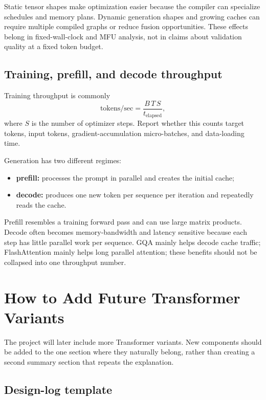 \documentclass[11pt,a4paper]{article}
\theoremstyle{definition}
\theoremstyle{plain}
\begin{document}
Static tensor shapes make optimization easier because the compiler can specialize schedules and memory plans. Dynamic generation shapes and growing caches can require multiple compiled graphs or reduce fusion opportunities. These effects belong in fixed-wall-clock and MFU analysis, not in claims about validation quality at a fixed token budget.

\subsection{Training, prefill, and decode throughput}

Training throughput is commonly
\begin{equation}
    \mathrm{tokens/sec}
    =\frac{B\,T\,S}{t_{\mathrm{elapsed}}},
\end{equation}
where $S$ is the number of optimizer steps. Report whether this counts target tokens, input tokens, gradient-accumulation micro-batches, and data-loading time.

Generation has two different regimes:
\begin{itemize}[nosep]
    \item \textbf{prefill:} processes the prompt in parallel and creates the initial cache;
    \item \textbf{decode:} produces one new token per sequence per iteration and repeatedly reads the cache.
\end{itemize}
Prefill resembles a training forward pass and can use large matrix products. Decode often becomes memory-bandwidth and latency sensitive because each step has little parallel work per sequence. GQA mainly helps decode cache traffic; FlashAttention mainly helps long parallel attention; these benefits should not be collapsed into one throughput number.

\section{How to Add Future Transformer Variants}
\label{sec:future-variants}

The project will later include more Transformer variants. New components should be added to the one section where they naturally belong, rather than creating a second summary section that repeats the explanation.

\subsection{Design-log template}
\end{document}
